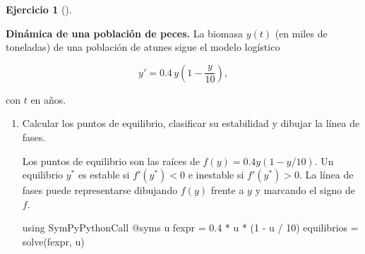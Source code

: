 \documentclass[
  spanish,
  a4paper,
]{scrreport}
\newenvironment{Shaded}{\begin{snugshade}}{\end{snugshade}}
\newcommand{\BuiltInTok}[1]{\textcolor[rgb]{0.00,0.23,0.31}{#1}}
\newcommand{\FloatTok}[1]{\textcolor[rgb]{0.68,0.00,0.00}{#1}}
\newcommand{\FunctionTok}[1]{\textcolor[rgb]{0.28,0.35,0.67}{#1}}
\newcommand{\ImportTok}[1]{\textcolor[rgb]{0.00,0.46,0.62}{#1}}
\newcommand{\NormalTok}[1]{\textcolor[rgb]{0.00,0.23,0.31}{#1}}
\newcommand{\OperatorTok}[1]{\textcolor[rgb]{0.37,0.37,0.37}{#1}}
\newcommand{\PreprocessorTok}[1]{\textcolor[rgb]{0.68,0.00,0.00}{#1}}
\theoremstyle{definition}
\newtheorem{exercise}{Ejercicio}[chapter]
\theoremstyle{remark}
\begin{document}
\begin{exercise}[]\protect\hypertarget{exr-linea-fases-pesqueria}{}\label{exr-linea-fases-pesqueria}

\textbf{Dinámica de una población de peces.} La biomasa \(y(t)\) (en
miles de toneladas) de una población de atunes sigue el modelo logístico

\[
y' = 0.4\, y\left(1 - \frac{y}{10}\right),
\]

con \(t\) en años.

\begin{enumerate}
\def\labelenumi{\alph{enumi}.}
\item
  Calcular los puntos de equilibrio, clasificar su estabilidad y dibujar
  la línea de fases.

  \begin{tcolorbox}[enhanced jigsaw, arc=.35mm, bottomrule=.15mm, bottomtitle=1mm, breakable, colback=white, colbacktitle=quarto-callout-note-color!10!white, colframe=quarto-callout-note-color-frame, coltitle=black, left=2mm, leftrule=.75mm, opacityback=0, opacitybacktitle=0.6, rightrule=.15mm, title=\textcolor{quarto-callout-note-color}{\faInfo}\hspace{0.5em}{Ayuda}, titlerule=0mm, toprule=.15mm, toptitle=1mm]

  Los puntos de equilibrio son las raíces de \(f(y)=0.4y(1-y/10)\). Un
  equilibrio \(y^*\) es estable si \(f'(y^*)<0\) e inestable si
  \(f'(y^*)>0\). La línea de fases puede representarse dibujando
  \(f(y)\) frente a \(y\) y marcando el signo de \(f\).

  \end{tcolorbox}

  \begin{tcolorbox}[enhanced jigsaw, arc=.35mm, bottomrule=.15mm, bottomtitle=1mm, breakable, colback=white, colbacktitle=quarto-callout-tip-color!10!white, colframe=quarto-callout-tip-color-frame, coltitle=black, left=2mm, leftrule=.75mm, opacityback=0, opacitybacktitle=0.6, rightrule=.15mm, title=\textcolor{quarto-callout-tip-color}{\faLightbulb}\hspace{0.5em}{Solución}, titlerule=0mm, toprule=.15mm, toptitle=1mm]

\begin{Shaded}
\begin{Highlighting}[]
\ImportTok{using} \BuiltInTok{SymPyPythonCall}
\PreprocessorTok{@syms}\NormalTok{ u}
\NormalTok{fexpr }\OperatorTok{=} \FloatTok{0.4} \OperatorTok{*}\NormalTok{ u }\OperatorTok{*}\NormalTok{ (}\FloatTok{1} \OperatorTok{{-}}\NormalTok{ u }\OperatorTok{/} \FloatTok{10}\NormalTok{)}
\NormalTok{equilibrios }\OperatorTok{=} \FunctionTok{solve}\NormalTok{(fexpr, u)}
\end{Highlighting}
\end{Shaded}


\end{tcolorbox}
\end{enumerate}
\end{exercise}
\end{document}

